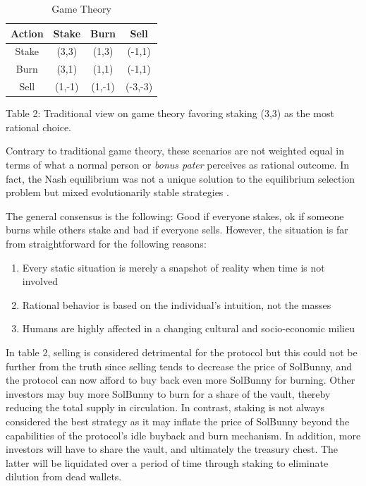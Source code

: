 \documentclass[12pt]{article}
\begin{document}
\begin{table}[ht]
\caption{Game Theory}
\centering
\begin{tabular}{||c| c| c| c||} 
 \hline
Action & Stake &  Burn & Sell \\ [0.5ex] 
 \hline\hline
Stake & (3,3) & (1,3) & (-1,1) \\ 
 \hline
Burn & (3,1) & (1,1) & (-1,1) \\
 \hline
Sell & (1,-1)& (1,-1) & (-3,-3) \\
 \hline
\end{tabular}
\label{Table 2}

Table 2: Traditional view on game theory favoring staking (3,3) as the most rational choice.
\end{table}

Contrary to traditional game theory, these scenarios are not weighted equal in terms of what a normal person or \textit{bonus pater} perceives as rational outcome. In fact, the Nash equilibrium was not a unique solution to the equilibrium selection problem but mixed evolutionarily stable strategies \cite{evogame}.

The general consensus is the following: Good if everyone stakes, ok if someone burns while others stake and bad if everyone sells. However, the situation is far from straightforward for the following reasons:

\begin{enumerate}[label=(\roman*)]

\item Every static situation is merely a snapshot of reality when time is not involved

\item  Rational behavior is based on the individual’s intuition, not the masses

\item  Humans are highly affected in a changing cultural and socio-economic milieu

\end{enumerate}

In table 2, selling is considered detrimental for the protocol but this could not be further from the truth since selling tends to decrease the price of SolBunny, and the protocol can now afford to buy back even more SolBunny for burning. Other investors may buy more SolBunny to burn for a share of the vault, thereby reducing the total supply in circulation. In contrast, staking is not always considered the best strategy as it may inflate the price of SolBunny beyond the capabilities of the protocol’s idle buyback and burn mechanism. In addition, more investors will have to share the vault, and ultimately the treasury chest. The latter will be liquidated over a period of time through staking to eliminate dilution from dead wallets.
\end{document}
